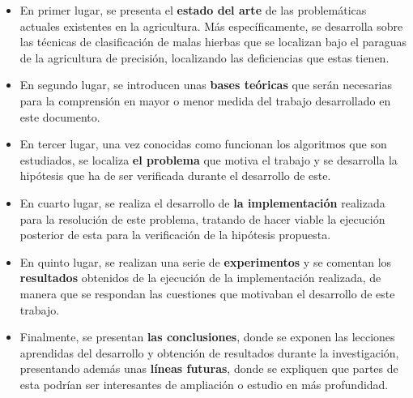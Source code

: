 \begin{itemize}

    \item En primer lugar, se presenta el \textbf{estado del arte} de las problemáticas actuales existentes en la agricultura. Más específicamente, se desarrolla sobre las técnicas de clasificación de malas hierbas que se localizan bajo el paraguas de la agricultura de precisión, localizando las deficiencias que estas tienen.
    
    \item En segundo lugar, se introducen unas \textbf{bases teóricas} que serán necesarias para la comprensión en mayor o menor medida del trabajo desarrollado en este documento.
    
    \item En tercer lugar, una vez conocidas como funcionan los algoritmos que son estudiados, se localiza \textbf{el problema} que motiva el trabajo y se desarrolla la hipótesis que ha de ser verificada durante el desarrollo de este.
    
    \item En cuarto lugar, se realiza el desarrollo de \textbf{la implementación} realizada para la resolución de este problema, tratando de hacer viable la ejecución posterior de esta para la verificación de la hipótesis propuesta.
    
    \item En quinto lugar, se realizan una serie de \textbf{experimentos} y se comentan los \textbf{resultados} obtenidos de la ejecución de la implementación realizada, de manera que se respondan las cuestiones que motivaban el desarrollo de este trabajo.
    
    \item Finalmente, se presentan \textbf{las conclusiones}, donde se exponen las lecciones aprendidas del desarrollo y obtención de resultados durante la investigación, presentando además unas \textbf{líneas futuras}, donde se expliquen que partes de esta podrían ser interesantes de ampliación o estudio en más profundidad.
    
\end{itemize}
